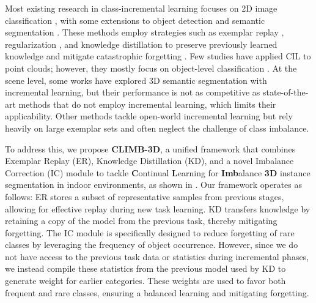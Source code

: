 Most existing research in class-incremental learning focuses on 2D image classification \cite{rebuffi2017icarl, li2017learning, aljundi2018memory, serra2018overcoming}, with some extensions to object detection \cite{liu2023continual, joseph2021towards, shmelkov2017incremental} and semantic segmentation \cite{cermelli2020modeling, cermelli2022incremental, douillard2021plop}. These methods employ strategies such as exemplar replay \cite{buzzega2020dark, rebuffi2017icarl, cha2021co2l, kamra2017deep}, regularization \cite{aljundi2018memory, li2017learning, serra2018overcoming}, and knowledge distillation \cite{douillard2020podnet, kang2022class} to preserve previously learned knowledge and mitigate catastrophic forgetting \cite{mccloskey1989catastrophic}. Few studies have applied CIL to point clouds; however, they mostly focus on object-level classification \cite{dong2021i3dol, liu2021l3doc, chowdhury2021learning}.
At the scene level, some works have explored 3D semantic segmentation \cite{Yang_2023_CVPR} with incremental learning, but their performance is not as competitive as state-of-the-art methods that do not employ incremental learning, which limits their applicability.
Other methods tackle open-world incremental learning \cite{boudjoghra20243d} but rely heavily on large exemplar sets \cite{rolnick2019experience} and often neglect the challenge of class imbalance. 

To address this, we propose \textbf{CLIMB-3D}, a unified framework that combines Exemplar Replay (ER), Knowledge Distillation (KD), and a novel Imbalance Correction (IC) module to tackle \textbf{C}ontinual \textbf{L}earning for \textbf{Imb}alance \textbf{3D} instance segmentation in indoor environments, as shown in . Our framework operates as follows: ER stores a subset of representative samples from previous stages, allowing for effective replay during new task learning. KD transfers knowledge by retaining a copy of the model from the previous task, thereby mitigating forgetting. The IC module is specifically designed to reduce forgetting of rare classes by leveraging the frequency of object occurrence. However, since we do not have access to the previous task data or statistics during incremental phases, we instead compile these statistics from the previous model used by KD to generate weight for earlier categories. These weights are used to favor both frequent and rare classes, ensuring a balanced learning and mitigating forgetting.

